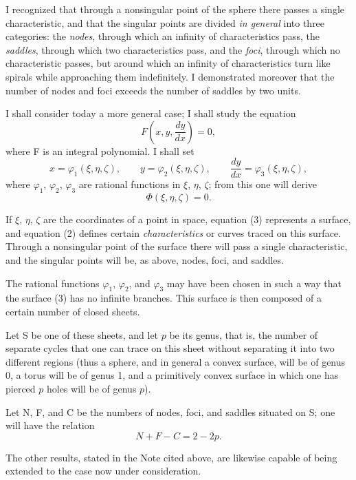 \documentclass[11pt]{article}
\begin{document}
I recognized that through a nonsingular point of the sphere there passes a single characteristic, and that the singular points are divided \emph{in general} into three categories: the \emph{nodes}, through which an infinity of characteristics pass, the \emph{saddles}, through which two characteristics pass, and the \emph{foci}, through which no characteristic passes, but around which an infinity of characteristics turn like spirals while approaching them indefinitely. I demonstrated moreover that the number of nodes and foci exceeds the number of saddles by two units.

I shall consider today a more general case; I shall study the equation
\begin{equation}\tag{2}
F\left(x,y,\frac{dy}{dx}\right)=0,
\end{equation}
where F is an integral polynomial. I shall set
\[
x=\varphi_1(\xi,\eta,\zeta),\qquad
 y=\varphi_2(\xi,\eta,\zeta),\qquad
\frac{dy}{dx}=\varphi_3(\xi,\eta,\zeta),
\]
where $\varphi_1$, $\varphi_2$, $\varphi_3$ are rational functions in $\xi$, $\eta$, $\zeta$; from this one will derive
\begin{equation}\tag{3}
\Phi(\xi,\eta,\zeta)=0.
\end{equation}

If $\xi$, $\eta$, $\zeta$ are the coordinates of a point in space, equation (3) represents a surface, and equation (2) defines certain \emph{characteristics} or curves traced on this surface. Through a nonsingular point of the surface there will pass a single characteristic, and the singular points will be, as above, nodes, foci, and saddles.

The rational functions $\varphi_1$, $\varphi_2$, and $\varphi_3$ may have been chosen in such a way that the surface (3) has no infinite branches. This surface is then composed of a certain number of closed sheets.

Let S be one of these sheets, and let $p$ be its genus, that is, the number of separate cycles that one can trace on this sheet without separating it into two different regions (thus a sphere, and in general a convex surface, will be of genus 0, a torus will be of genus 1, and a primitively convex surface in which one has pierced $p$ holes will be of genus $p$).

Let N, F, and C be the numbers of nodes, foci, and saddles situated on S; one will have the relation
\[
N+F-C=2-2p.
\]

The other results, stated in the Note cited above, are likewise capable of being extended to the case now under consideration.
\end{document}
